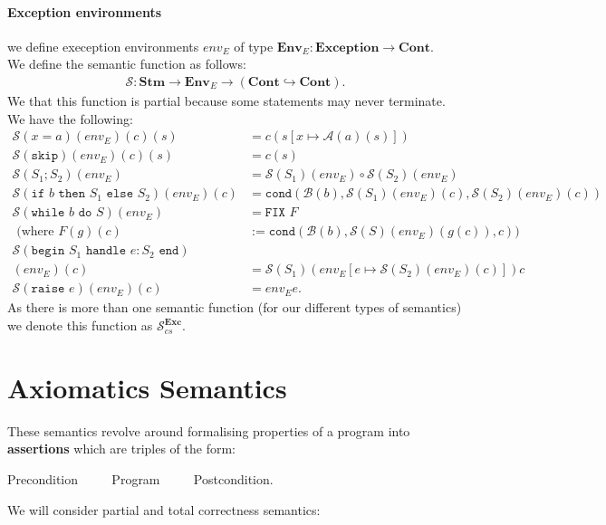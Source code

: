 \documentclass[a4paper, 12pt, twoside]{article}
\begin{document}
\paragraph{Exception environments} we define exeception environments
$env_E$ of type \newline 
$\textbf{Env}_E : \textbf{Exception} \to \textbf{Cont}$.
\\[\baselineskip]
We define the semantic function as follows: \begin{gather*}
  \mathcal{S}: \textbf{Stm} \to \textbf{Env}_E 
  \to (\textbf{Cont} \hookrightarrow \textbf{Cont}).
\end{gather*} We that this function is partial because some statements
may never terminate. We have the following: \begin{align*}
  \mathcal{S}(x = a)(env_E)(c)(s) &= c(s[x \mapsto \mathcal{A}(a)(s)]) \\
  \mathcal{S}(\texttt{skip})(env_E)(c)(s) &= c(s) \\
  \mathcal{S}(S_1 ; S_2)(env_E) &= \mathcal{S}(S_1)(env_E) \circ \mathcal{S}(S_2)(env_E) \\
  \mathcal{S}(\texttt{if } b \texttt{ then } S_1 \texttt{ else } S_2)(env_E)(c)
  &= \texttt{cond}(\mathcal{B}(b), \mathcal{S}(S_1)(env_E)(c), \mathcal{S}(S_2)(env_E)(c)) \\
  \mathcal{S}(\texttt{while } b \texttt{ do } S)(env_E)
  &= \texttt{FIX } F \\
  \text{ (where } F(g)(c) &
  := \texttt{cond}(\mathcal{B}(b), \mathcal{S}(S)(env_E)(g(c)), c)) \\
  \mathcal{S}(\texttt{begin } S_1 \texttt{ handle } e: S_2 \texttt{ end}) \\
  (env_E)(c) &= \mathcal{S}(S_1)(env_E[e \mapsto \mathcal{S}(S_2)(env_E)(c)]) c \\
  \mathcal{S}(\texttt{raise } e)(env_E)(c) &= env_E e.
\end{align*} 
As there is more than one semantic function (for our different types
of semantics) we denote this function as $\mathcal{S}_{cs}^{\textbf{Exc}}$.

\section{Axiomatics Semantics}

These semantics revolve around formalising properties of a program
into \textbf{assertions} which are triples of the form: \begin{center}
  Precondition $\qquad$ Program $\qquad$ Postcondition.
\end{center} We will consider partial and total correctness semantics:
\end{document}
